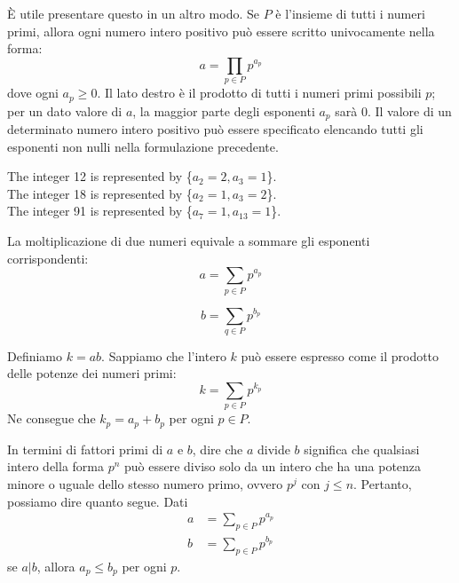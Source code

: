 \documentclass{article}
\theoremstyle{definition}
\begin{document}
È utile presentare questo in un altro modo. Se \( P \) è l'insieme di tutti i numeri primi, allora ogni numero intero positivo può essere scritto univocamente nella forma:
\[ a = \prod_{p \in P} p^{a_p} \]
dove ogni \( a_p \geq 0 \). Il lato destro è il prodotto di tutti i numeri primi possibili \( p \); per un dato valore di \( a \), la maggior parte degli esponenti \( a_p \) sarà 0. Il valore di un determinato numero intero positivo può essere specificato elencando tutti gli esponenti non nulli nella formulazione precedente.
\begin{center}
\begin{minipage}{0.8\textwidth} %
\begin{shaded}
\noindent
The integer 12 is represented by \{$a_2 = 2, a_3 = 1$\}. \\
The integer 18 is represented by \{$a_2 = 1, a_3 = 2$\}. \\
The integer 91 is represented by \{$a_7 = 1, a_{13} = 1$\}.
\end{shaded}
\end{minipage}
\end{center}

La moltiplicazione di due numeri equivale a sommare gli esponenti corrispondenti:
\begin{equation*}
a = \sum_{p \in P} p^{a_p}
\end{equation*}


\begin{equation*}
b = \sum_{q \in P} p^{b_p}
\end{equation*}


Definiamo \( k = ab \). Sappiamo che l'intero \( k \) può essere espresso come il prodotto delle potenze dei numeri primi: 
\begin{equation*}
k = \sum_{p \in P} p^{k_p}
\end{equation*}
Ne consegue che \( k_p = a_p + b_p \) per ogni \( p \in P \).


In termini di fattori primi di \( a \) e \( b \), dire che \( a \) divide \( b \) significa che qualsiasi intero della forma \( p^n \) può essere diviso solo da un intero che ha una potenza 
minore o uguale dello stesso numero primo, ovvero \( p^j \) con \( j \leq n \). Pertanto, possiamo dire quanto segue.
Dati
\begin{align*}
a &= \sum_{p \in P} p^{a_p} \\
b &= \sum_{p \in P} p^{b_p}
\end{align*}
se \( a | b \), allora \( a_p \leq b_p \) per ogni \( p \).\cite{tls}
\end{document}
